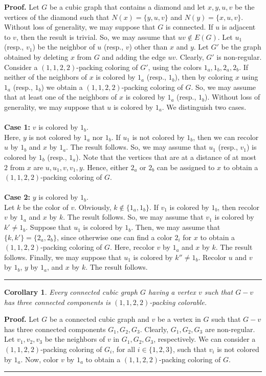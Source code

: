 \documentclass[12pt, oneside]{scrartcl}
\newtheorem{corollary}{Corollary}%
\newenvironment{proof}[1][Proof]{\textbf{#1.} }{\ \rule{0.5em}{0.5em}}
\begin{document}
\begin{proof}
Let $G$ be a cubic graph that contains a diamond and let $x,y,u,v$ be the vertices of the diamond such that $N(x)=\{y,u,v\}$ and $N(y)=\{x,u,v\}$. Without loss of generality, we may suppose that $G$ is connected. If $u$ is adjacent to $v$, then the result is trivial. So, we may assume that $uv\notin E(G)$. Let $u_1$ (resp., $v_1$) be the neighbor of $u$ (resp., $v$) other than $x$ and $y$. Let $G'$ be the graph obtained by deleting $x$ from $G$ and adding the edge $uv$. Clearly, $G'$ is non-regular. Consider a $(1,1,2,2)$-packing coloring of $G'$, using the colors $1_a,1_b,2_a,2_b$. If neither of the neighbors of $x$ is colored by $1_a$ (resp., $1_b$), then by coloring $x$ using $1_a$ (resp., $1_b$) we obtain a $(1,1,2,2)$-packing coloring of $G$. So, we may assume that at least one of the neighbors of $x$ is colored by $1_a$ (resp., $1_b$). Without loss of generality, we may suppose that $u$ is colored by $1_a$. We distinguish two cases.\\
\\
\textbf{Case 1:} $v$ is colored by $1_b$.\\
Here, $y$ is not colored by $1_a$ nor $1_b$. If $u_1$ is not colored by $1_b$, then we can recolor $u$ by $1_b$ and $x$ by $1_a$. The result follows. So, we may assume that $u_1$ (resp., $v_1$) is colored by $1_b$ (resp., $1_a$). Note that the vertices that are at a distance of at most $2$ from $x$ are $u,u_1,v,v_1,y$. Hence, either $2_a$ or $2_b$ can be assigned to $x$ to obtain a $(1,1,2,2)$-packing coloring of $G$.\\
\\
\textbf{Case 2:} $y$ is colored by $1_b$.\\
Let $k$ be the color of $v$. Obviously, $k\notin \{1_a,1_b\}$. If $v_1$ is colored by $1_b$, then recolor $v$ by $1_a$ and $x$ by $k$. The result follows. So, we may assume that $v_1$ is colored by $k'\neq 1_b$. Suppose that $u_1$ is colored by $1_b$. Then, we may assume that $\{k,k'\}=\{2_a,2_b\}$, since otherwise one can find a color $2_i$ for $x$ to obtain a $(1,1,2,2)$-packing coloring of $G$. Here, recolor $v$ by $1_a$ and $x$ by $k$. The result follows. Finally, we may suppose that $u_1$ is colored by $k''\neq 1_b$. Recolor $u$ and $v$ by $1_b$, $y$ by $1_a$, and $x$ by $k$. The result follows.
\end{proof}

\begin{corollary}\label{corollary 2}
    Every connected cubic graph $G$ having a vertex $v$ such that $G-v$ has three connected components is $(1,1,2,2)$-packing colorable.
\end{corollary}
\begin{proof}
Let $G$ be a connected cubic graph and $v$ be a vertex in $G$ such that $G-v$ has three connected components $G_1,G_2,G_3$. Clearly, $G_1,G_2,G_3$ are non-regular. Let $v_1,v_2,v_3$ be the neighbors of $v$ in $G_1,G_2,G_3$, respectively. We can consider a $(1,1,2,2)$-packing coloring of $G_i$, for all $i\in \{1,2,3\}$, such that $v_i$ is not colored by $1_a$. Now, color $v$ by $1_a$ to obtain a $(1,1,2,2)$-packing coloring of $G$.
\end{proof}
\end{document}
